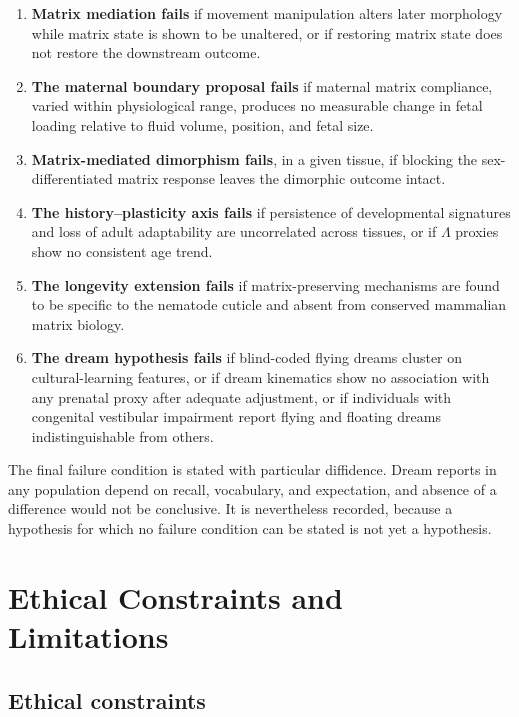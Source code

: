 \documentclass[11pt,a4paper]{article}
\theoremstyle{plain}
\theoremstyle{definition}
\theoremstyle{remark}
\begin{document}
\begin{enumerate}[itemsep=4pt]
\item \textbf{Matrix mediation fails} if movement manipulation alters later morphology while matrix state is shown to be unaltered, or if restoring matrix state does not restore the downstream outcome.
\item \textbf{The maternal boundary proposal fails} if maternal matrix compliance, varied within physiological range, produces no measurable change in fetal loading relative to fluid volume, position, and fetal size.
\item \textbf{Matrix-mediated dimorphism fails}, in a given tissue, if blocking the sex-differentiated matrix response leaves the dimorphic outcome intact.
\item \textbf{The history--plasticity axis fails} if persistence of developmental signatures and loss of adult adaptability are uncorrelated across tissues, or if $\Lambda$ proxies show no consistent age trend.
\item \textbf{The longevity extension fails} if matrix-preserving mechanisms are found to be specific to the nematode cuticle and absent from conserved mammalian matrix biology.
\item \textbf{The dream hypothesis fails} if blind-coded flying dreams cluster on cultural-learning features, or if dream kinematics show no association with any prenatal proxy after adequate adjustment, or if individuals with congenital vestibular impairment report flying and floating dreams indistinguishable from others.
\end{enumerate}

\begin{caution}
The final failure condition is stated with particular diffidence. Dream reports in any population depend on recall, vocabulary, and expectation, and absence of a difference would not be conclusive. It is nevertheless recorded, because a hypothesis for which no failure condition can be stated is not yet a hypothesis.
\end{caution}

\section{Ethical Constraints and Limitations}\label{sec:ethics}

\subsection{Ethical constraints}
\end{document}
